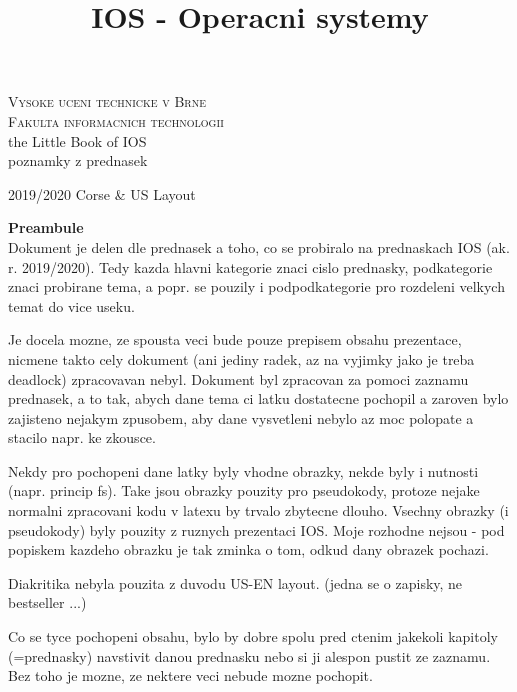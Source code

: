 \documentclass[a4paper, 11pt]{article}
\title{IOS - Operacni systemy}
\date{}
\begin{document}
\begin{titlepage}

\begin{center}
\LARGE
\textsc{\Huge Vysoke uceni technicke v Brne}\\
\textsc{\huge Fakulta informacnich technologii}\\
the Little Book of IOS\\[0.4em]
{\Huge poznamky z prednasek}
\end{center}
{\Large 2019/2020 \hfill Corse \& US Layout}

\end{titlepage}


\tableofcontents


\newpage

\textbf{Preambule} \\

Dokument je delen dle prednasek a toho, co se probiralo na prednaskach IOS (ak. r. 2019/2020). Tedy kazda hlavni kategorie znaci cislo prednasky, podkategorie znaci probirane tema, a popr. se pouzily i podpodkategorie pro rozdeleni velkych temat do vice useku.

Je docela mozne, ze spousta veci bude pouze prepisem obsahu prezentace, nicmene takto cely dokument (ani jediny radek, az na vyjimky jako je treba deadlock) zpracovavan nebyl. Dokument byl zpracovan za pomoci zaznamu prednasek, a to tak, abych dane tema ci latku dostatecne pochopil a zaroven bylo zajisteno nejakym zpusobem, aby dane vysvetleni nebylo az moc polopate a stacilo napr. ke zkousce.

Nekdy pro pochopeni dane latky byly vhodne obrazky, nekde byly i nutnosti (napr. princip fs). Take jsou obrazky pouzity pro pseudokody, protoze nejake normalni zpracovani kodu v latexu by trvalo zbytecne dlouho. Vsechny obrazky (i pseudokody) byly pouzity z ruznych prezentaci IOS. Moje rozhodne nejsou - pod popiskem kazdeho obrazku je tak zminka o tom, odkud dany obrazek pochazi.

Diakritika nebyla pouzita z duvodu US-EN layout. (jedna se o zapisky, ne bestseller ...)

Co se tyce pochopeni obsahu, bylo by dobre spolu pred ctenim jakekoli kapitoly (=prednasky) navstivit danou prednasku nebo si ji alespon pustit ze zaznamu. Bez toho je mozne, ze nektere veci nebude mozne pochopit. 
\end{document}
